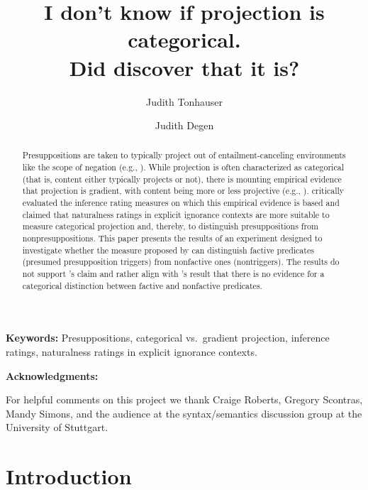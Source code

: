\documentclass[11pt,fleqn]{article}
\title{I don't know if projection is categorical. \\ Did \citealt{mandelkern-etal2020} discover that it is?}
\author[$\circ$]{Judith Tonhauser}
\author[$\bullet$]{Judith Degen}
\affil[$\circ$]{University of Stuttgart}
\affil[$\bullet$]{Stanford University}
\newcommand{\6}{\mbox{$[\hspace*{-.6mm}[$}}
\newcommand{\9}{\mbox{$]\hspace*{-.6mm}]$}}
\newcommand{\citepos}[1]{\citeauthor{#1}'s \citeyear{#1}}
\begin{document}
\maketitle


\begin{abstract}

Presuppositions are taken to typically project out of entailment-canceling environments like the scope of negation (e.g., \citealt{ccmg90}). While projection is often characterized as categorical (that is, content either typically projects or not), there is mounting empirical evidence that projection is gradient, with content being more or less projective (e.g., \citealt{karttunen71b,xue-onea11,demarneffe-etal-sub23,tbd-variability,degen-tonhauser-language}). \citealt{mandelkern-etal2020} critically evaluated the inference rating measures on which this empirical evidence is based and claimed that naturalness ratings in explicit ignorance contexts are more suitable to measure categorical projection and, thereby, to distinguish presuppositions from nonpresuppositions. This paper presents the results of an experiment designed to investigate whether the measure proposed by \citealt{mandelkern-etal2020} can distinguish factive predicates (presumed presupposition triggers) from nonfactive ones (nontriggers). The results do not support \citepos{mandelkern-etal2020} claim and rather align with \citepos{degen-tonhauser-language} result that there is no evidence for a categorical distinction between factive and nonfactive predicates. 

\end{abstract}

\bigskip

\noindent
{\bf Keywords:} Presuppositions, categorical vs.\ gradient projection, inference ratings, naturalness ratings in explicit ignorance contexts. 

\bigskip

\noindent
{\bf Acknowledgments:} 

\noindent
For helpful comments on this project we thank Craige Roberts, Gregory Scontras, Mandy Simons, and the audience at the syntax/semantics discussion group at the University of Stuttgart.

\newpage
		
\section{Introduction}\label{s1}
\end{document}
